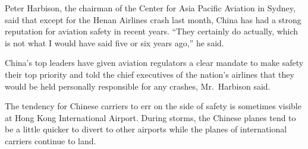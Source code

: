 ﻿\documentclass[12pt]{article}
\begin{document}
Peter Harbison, the chairman of the Center for Asia Pacific Aviation in Sydney, said that except for
the Henan Airlines crash last month, China has had a strong reputation for aviation safety in recent
years. ``They certainly do actually, which is not what I would have said five or six years ago,'' he
said.

China's top leaders have given aviation regulators a clear mandate to make safety their top priority
and told the chief executives of the nation's airlines that they would be held personally
responsible for any crashes, Mr.~Harbison said.

The tendency for Chinese carriers to err on the side of safety is sometimes visible at Hong Kong
International Airport. During storms, the Chinese planes tend to be a little quicker to divert to
other airports while the planes of international carriers continue to land.



\end{document}
